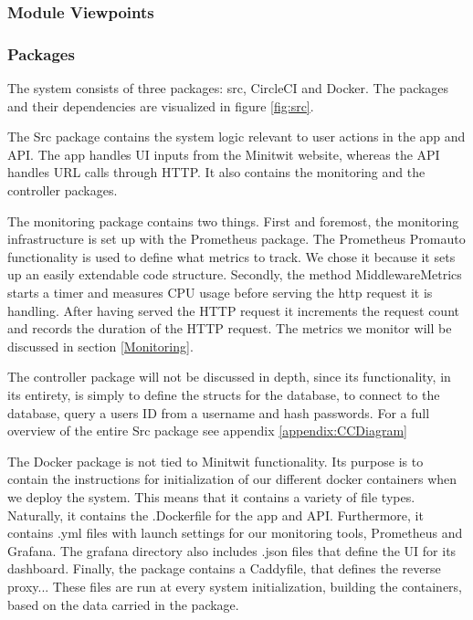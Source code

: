 \subsubsection{Module Viewpoints}

\subsubsection*{Packages}

The system consists of three packages: src, CircleCI and Docker. The packages and their dependencies are visualized in figure \ref{fig:src}.

The Src package contains the system logic relevant to user actions in the app and API. The app handles UI inputs from the Minitwit website, whereas the API handles URL calls through HTTP. It also contains the monitoring and the controller packages.

The monitoring package contains two things. First and foremost, the monitoring infrastructure is set up with the Prometheus package.
The Prometheus Promauto functionality is used to define what metrics to track. We chose it because it sets up an easily extendable code structure.
Secondly, the method MiddlewareMetrics starts a timer and measures CPU usage before serving the http request it is handling. After having served the HTTP request it increments the request count and records the duration of the HTTP request. The metrics we monitor will be discussed in section \ref{Monitoring}.

The controller package will not be discussed in depth, since its functionality, in its entirety, is simply to define the structs for the database, to connect to the database, query a users ID from a username and hash passwords.
\newline
For a full overview of the entire Src package see appendix \ref{appendix:CCDiagram}

The Docker package is not tied to Minitwit functionality. Its purpose is to contain the instructions for initialization of our different docker containers when we deploy the system. This means that it contains a variety of file types. Naturally, it contains the .Dockerfile for the app and API. Furthermore, it contains .yml files with launch settings for our monitoring tools, Prometheus and Grafana. The grafana directory also includes .json files that define the UI for its dashboard. Finally, the package contains a Caddyfile, that defines the reverse proxy...
These files are run at every system initialization, building the containers, based on the data carried in the package.

